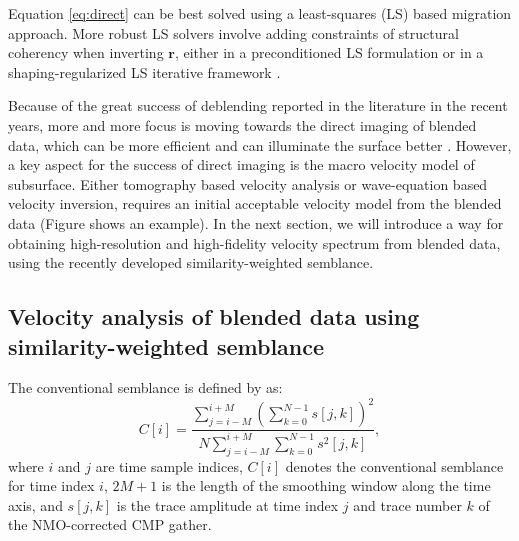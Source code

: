 Equation \ref{eq:direct} can be best solved using a least-squares (LS) based migration approach. More robust LS solvers involve adding  constraints of structural coherency when inverting $\mathbf{r}$, either in a preconditioned LS formulation \cite[]{daiwei2011,yangkang2015image} or in a shaping-regularized LS iterative framework \cite[]{fomel2007shape,zhiguang2014}.  

Because of the great success of deblending reported in the literature \cite[]{abma2010,mahdad2011,beasley2012,chengbo2013,shuwei2015seg,shaohuan2015,yangkang2015dbortho} in the recent years, more and more focus is  moving towards the direct imaging of blended data, which can be more efficient and can illuminate the surface better \cite[]{verschuur2011,berkhout2012}.  However, a key aspect for the success of direct imaging is the macro velocity model of subsurface. Either tomography based velocity analysis or  wave-equation based velocity inversion, requires an initial acceptable velocity model from the  blended data (Figure  shows an example). In the next section, we will introduce a way for obtaining high-resolution and high-fidelity velocity spectrum from blended data, using the recently developed similarity-weighted semblance. 


\subsection{Velocity analysis of blended data using similarity-weighted semblance}
The conventional semblance is defined by \cite{neidell1971} as:
\begin{equation}
\label{eq:semb}
C[i] = \frac{\displaystyle\sum_{j=i-M}^{i+M}\left(\sum_{k=0}^{N-1}s[j,k]\right)^2}{\displaystyle N\sum_{j=i-M}^{i+M}\sum_{k=0}^{N-1}s^2[j,k]},
\end{equation}
where $i$ and $j$ are time sample indices, $C[i]$ denotes the conventional semblance for time index $i$, $2M+1$ is the length of the smoothing window along the time axis, and $s[j,k]$ is the trace amplitude at time index $j$ and trace number $k$ of the NMO-corrected CMP gather.

